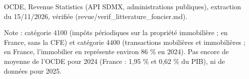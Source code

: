 OCDE, Revenue Statistics (API SDMX, administrations publiques), extraction du 15/11/2026, vérifiée (revue/verif\_litterature\_foncier.md).\par Note : catégorie 4100 (impôts périodiques sur la propriété immobilière ; en France, sans la CFE) et catégorie 4400 (transactions mobilières et immobilières ; en France, l'immobilier en représente environ 86 \% en 2024). Pas encore de moyenne de l'OCDE pour 2024 (France : 1,95 \% et 0,62 \% du PIB), ni de données pour 2025.
